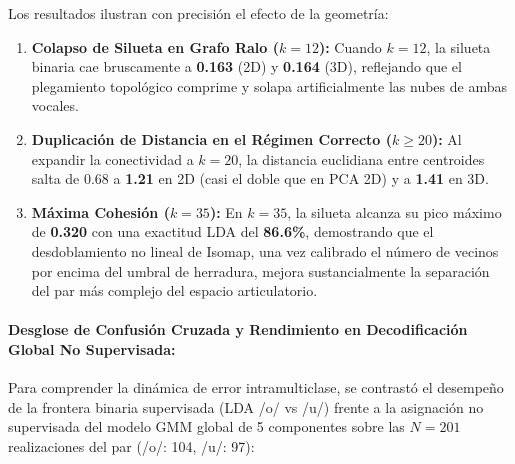 \documentclass[11pt,a4paper,openany]{book}
\theoremstyle{definition}
\begin{document}
Los resultados ilustran con precisión el efecto de la geometría:
\begin{enumerate}
    \item \textbf{Colapso de Silueta en Grafo Ralo ($k = 12$):} Cuando $k = 12$, la silueta binaria cae bruscamente a \textbf{0.163} (2D) y \textbf{0.164} (3D), reflejando que el plegamiento topológico comprime y solapa artificialmente las nubes de ambas vocales.
    \item \textbf{Duplicación de Distancia en el Régimen Correcto ($k \ge 20$):} Al expandir la conectividad a $k = 20$, la distancia euclidiana entre centroides salta de 0.68 a \textbf{1.21} en 2D (casi el doble que en PCA 2D) y a \textbf{1.41} en 3D.
    \item \textbf{Máxima Cohesión ($k = 35$):} En $k = 35$, la silueta alcanza su pico máximo de \textbf{0.320} con una exactitud LDA del \textbf{86.6\%}, demostrando que el desdoblamiento no lineal de Isomap, una vez calibrado el número de vecinos por encima del umbral de herradura, mejora sustancialmente la separación del par más complejo del espacio articulatorio.
\end{enumerate}

\paragraph{Desglose de Confusión Cruzada y Rendimiento en Decodificación Global No Supervisada:}
Para comprender la dinámica de error intramulticlase, se contrastó el desempeño de la frontera binaria supervisada (LDA /o/ vs /u/) frente a la asignación no supervisada del modelo GMM global de 5 componentes sobre las $N = 201$ realizaciones del par (/o/: 104, /u/: 97):
\end{document}
